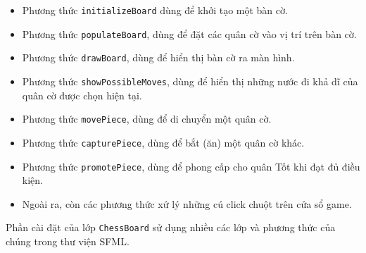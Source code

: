\begin{itemize}
 \item Phương thức \lstinline{initializeBoard} dùng để khởi tạo một bàn cờ.
 \item Phương thức \lstinline{populateBoard}, dùng để đặt các quân cờ vào vị trí trên bàn cờ.
  \item Phương thức \lstinline{drawBoard}, dùng để hiển thị bàn cờ ra màn hình.
  \item Phương thức \lstinline{showPossibleMoves}, dùng để hiển thị những nước đi khả dĩ của quân cờ được chọn hiện tại.
  \item Phương thức \lstinline{movePiece}, dùng để di chuyển một quân cờ.
  \item Phương thức \lstinline{capturePiece}, dùng để bắt (ăn) một quân cờ khác.
  \item Phương thức \lstinline{promotePiece}, dùng để phong cấp cho quân Tốt khi đạt đủ điều kiện.
  \item Ngoài ra, còn các phương thức xử lý những cú click chuột trên cửa sổ game.
\end{itemize} 
Phần cài đặt của lớp \lstinline{ChessBoard} sử dụng nhiều các lớp và phương thức của chúng trong thư viện SFML.